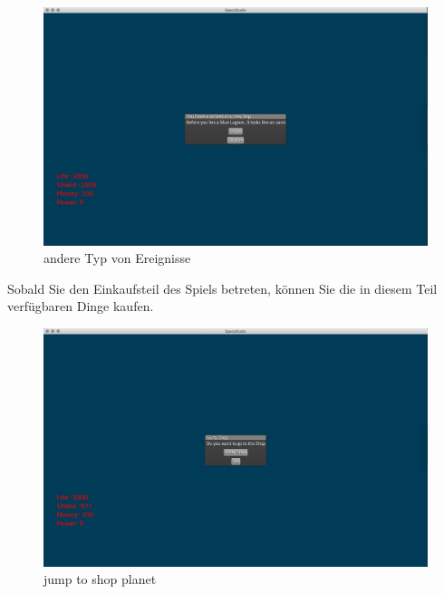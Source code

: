 \documentclass[12pt]{article}
\begin{document}
\begin{figure}[htp]
\centering
\includegraphics[scale=0.3]{TestProtocolBilder/otherEreignisse.png}
\caption{andere Typ von Ereignisse}
\end{figure}
Sobald Sie den Einkaufsteil des Spiels betreten, können Sie die in diesem Teil verfügbaren Dinge kaufen.
\begin{figure}[htp]
\centering
\includegraphics[scale=0.3]{TestProtocolBilder/shopPlanetJump.png}
\caption{jump to shop planet }
\end{figure}
\newpage
\end{document}
